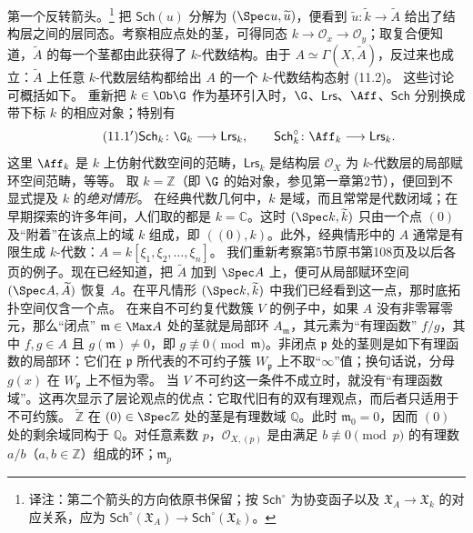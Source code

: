 第一个反转箭头。\footnote{译注：第二个箭头的方向依原书保留；按 $\mathsf{Sch}^{\circ}$ 为协变函子以及 $\mathfrak X_A\to\mathfrak X_k$ 的对应关系，应为 $\mathsf{Sch}^{\circ}(\mathfrak X_A)\to\mathsf{Sch}^{\circ}(\mathfrak X_k)$。}
把 $\mathsf{Sch}(u)$ 分解为 $(\Spec u,\widetilde u)$，便看到 $\widetilde u\colon\widetilde k\to\widetilde A$ 给出了结构层之间的层同态。考察相应点处的茎，可得同态 $k\to\mathcal O_x\to\mathcal O_y$；取复合便知道，$\widetilde A$ 的每一个茎都由此获得了 $k$-代数结构。由于 $A\simeq\Gamma(X,\widetilde A)$，反过来也成立：$\widetilde A$ 上任意 $k$-代数层结构都给出 $A$ 的一个 $k$-代数结构态射 (11.2)。
这些讨论可概括如下。
重新把 $k\in\Ob\G$ 作为基环引入时，$\G$、$\mathsf{Lrs}$、$\Aff$、$\mathsf{Sch}$ 分别换成带下标 $k$ 的相应对象；特别有
\begin{equation}\tag{$11.1'$}
\mathsf{Sch}_k\colon\G_k\longrightarrow\mathsf{Lrs}_k,\qquad
\mathsf{Sch}^{\circ}_k\colon\Aff_k\longrightarrow\mathsf{Lrs}_k.
\end{equation}
这里 $\Aff_k$ 是 $k$ 上仿射代数空间的范畴，$\mathsf{Lrs}_k$ 是结构层 $\mathcal O_X$ 为 $k$-代数层的局部赋环空间范畴，等等。
取 $k=\mathbb Z$（即 $\G$ 的始对象，参见第一章第2节），便回到不显式提及 $k$ 的\emph{绝对情形}。
在经典代数几何中，$k$ 是域，而且常常是代数闭域；在早期探索的许多年间，人们取的都是 $k=\mathbb C$。这时 $(\Spec k,\widetilde k)$ 只由一个点 $(0)$ 及“附着”在该点上的域 $k$ 组成，即 $((0),k)$。此外，经典情形中的 $A$ 通常是有限生成 $k$-代数：$A=k[\xi_1,\xi_2,\ldots,\xi_n]$。
我们重新考察第5节原书第108页及以后各页的例子。现在已经知道，把 $\widetilde A$ 加到 $\Spec A$ 上，便可从局部赋环空间 $(\Spec A,\widetilde A)$ 恢复 $A$。在平凡情形 $(\Spec k,\widetilde k)$ 中我们已经看到这一点，那时底拓扑空间仅含一个点。
在来自不可约复代数簇 $V$ 的例子中，如果 $A$ 没有非零幂零元，那么“闭点” $\mathfrak m\in\Max A$ 处的茎就是局部环 $A_{\mathfrak m}$，其元素为“有理函数” $f/g$，其中 $f,g\in A$ 且 $g(\mathfrak m)\ne0$，即 $g\not\equiv0\pmod{\mathfrak m}$。非闭点 $\mathfrak p$ 处的茎则是如下有理函数的局部环：它们在 $\mathfrak p$ 所代表的不可约子簇 $W_{\mathfrak p}$ 上不取“$\infty$”值；换句话说，分母 $g(x)$ 在 $W_{\mathfrak p}$ 上不恒为零。
当 $V$ 不可约这一条件不成立时，就没有“有理函数域”。这再次显示了层论观点的优点：它取代旧有的双有理观点，而后者只适用于不可约簇。
$\widetilde{\mathbb Z}$ 在 $(0)\in\Spec\mathbb Z$ 处的茎是有理数域 $\mathbb Q$。此时 $\mathfrak m_0=0$，因而 $(0)$ 处的剩余域同构于 $\mathbb Q$。对任意素数 $p$，$\mathcal O_{X,(p)}$ 是由满足 $b\not\equiv0\pmod p$ 的有理数 $a/b$（$a,b\in\mathbb Z$）组成的环；$\mathfrak m_p$
